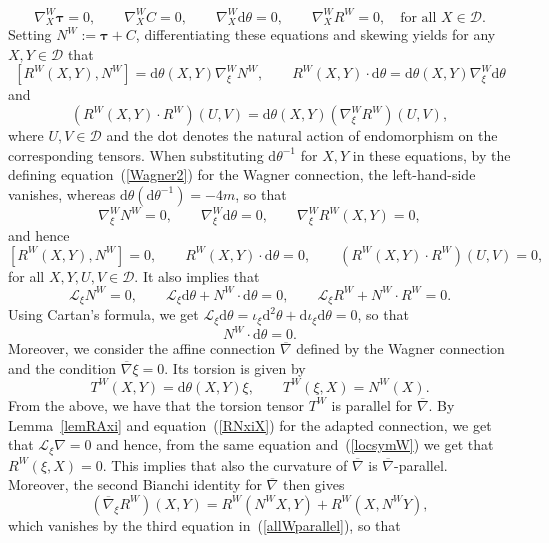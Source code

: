 \documentclass{amsart}
\theoremstyle{plain}
\theoremstyle{definition}
\newcommand{\bt}{{\boldsymbol{\tau}}}
\newcommand{\1}{\mathbf{1}}
\newcommand{\D}{{\mathcal D}}
\renewcommand{\d}{\mathrm{d}}
\renewcommand{\L}{{\mathcal L}}
\newcommand{\+}{\oplus}
\newcommand{\bnab}{\overline{\nabla}}
\newcommand{\nbW}{\overline{\nabla}}
\newcommand{\acom}[1]{
 \marginpar{{\scriptsize A: #1 }}}
\begin{document}
\begin{equation} 
\label{locsymW}
\nabla^W_X \bt=0,\qquad  \nabla^W_X C=0,\qquad \nabla^W_X \d\theta=0,\qquad \nabla^W_X R^W =0,\quad \text{for all }X\in\D.
\end{equation} 
Setting $N^W:=\bt +C$, differentiating these equations and skewing yields
   for any 
 $X,Y\in \D$ 
 that 
 \[
 [ R^W(X,Y) ,N^W]=\d\theta(X,Y) \nabla^W_\xi N^W,\qquad R^W(X,Y)\cdot \d \theta =  \d\theta(X,Y) \nabla^W_\xi \d\theta \]
 and \[(R^W(X,Y)\cdot R^W) (U,V) = \d\theta(X,Y)(\nabla^W_\xi R^W)(U,V),\]
  where $U,V\in \D$ and the dot denotes the natural action of endomorphism on the corresponding tensors.
 When substituting $\d\theta^{-1}$ for $X,Y$ in these  equations, by the defining equation~(\ref{Wagner2}) for the Wagner connection,  the left-hand-side vanishes, whereas $\d\theta(\d\theta^{-1})=-4m$,  so that 
 \begin{equation}
 \label{allWparallel}
 \nabla^W_\xi N^W=0,\qquad \nabla^W_\xi \d\theta=0,\qquad \nabla^W_\xi R^W(X,Y)=0,\end{equation}
and hence
 \begin{equation}
 \label{RWW}
 [ R^W(X,Y) ,N^W]=0,\qquad R^W(X,Y)\cdot \d \theta = 0,\qquad 
 (R^W(X,Y)\cdot R^W)(U,V)= 0,
 \end{equation}
for all $X,Y,U,V\in \D$. 
 It also implies that
 \begin{equation}
 \label{Liexi}
 \L_\xi N^W=0,\qquad  \L_\xi \d\theta +N^W\cdot \d\theta=0,\qquad \L_\xi R^W+N^W\cdot R^W=0.\end{equation}
Using Cartan's formula, we get 
$\L_\xi\d\theta = \iota_\xi\d^2\theta +\d  \iota_\xi\d\theta=0$, so that
\begin{equation}
\label{Wdtheta}
N^W\cdot \d\theta =0.
\end{equation}
Moreover, we consider the affine connection $\nbW$ defined by the Wagner connection and the condition $\nbW\xi=0$. Its torsion is given by
\[T^W(X,Y)=\d\theta(X,Y)\xi,\qquad T^W(\xi,X)=N^W(X).\]
From the above, we have that the torsion tensor $T^W$ is parallel for $\bnab$. 
By Lemma~\ref{lemRAxi} and equation~(\ref{RNxiX}) for the adapted connection, we get that $\L_\xi\nabla=0$ and hence, from the same equation and~(\ref{locsymW}) we get that $R^W(\xi,X)=0$.   This implies that also the curvature of $\bnab$ is  $\bnab$-parallel. Moreover,
the second Bianchi identity for $\nbW$ then gives
\[(\nbW_\xi R^W)(X,Y)=R^W(N^WX,Y)+R^W(X,N^WY),\]
which vanishes by the third equation in~(\ref{allWparallel}), so that
\end{document}
